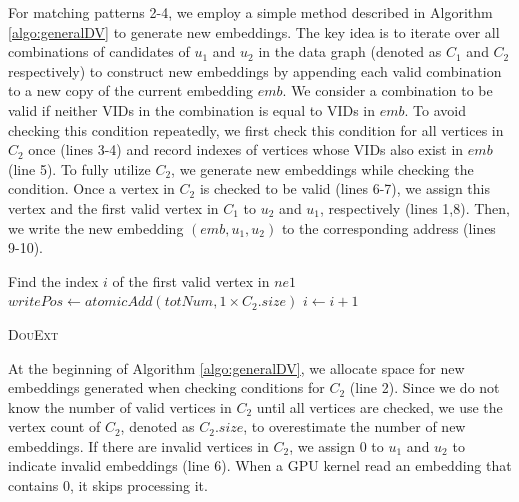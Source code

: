 For matching patterns 2-4, we employ a simple method described in Algorithm \ref{algo:generalDV} to generate new embeddings. The key idea
is to iterate over all combinations of candidates of $u_{1}$ and $u_{2}$ in the data graph (denoted as $C_1$ and $C_2$ respectively) to
construct new embeddings by appending each valid combination to a new copy of the current embedding $emb$. We consider a combination to be
valid if neither VIDs in the combination is equal to VIDs in $emb$. To avoid checking this condition repeatedly, we first check this
condition for all vertices in $C_2$ once (lines 3-4) and record indexes of vertices whose VIDs also exist in $emb$ (line 5). To fully
utilize $C_2$, we generate new embeddings while checking the condition. Once a vertex in $C_2$ is checked to be valid (lines 6-7), we
assign this vertex and the first valid vertex in $C_1$ to $u_2$ and $u_1$, respectively (lines 1,8). Then, we write the new embedding
$(emb,u_1,u_2)$ to the corresponding address (lines 9-10).

\begin{algorithm}[t!]
	Find the index $i$ of the first valid vertex in $ne1$\;
	$writePos \leftarrow atomicAdd(totNum,1 \times C_{2}.size)$\;
	$i \leftarrow i+1$\;
	\caption{\textsc{DouExt}}
	\label{algo:generalDV}
\end{algorithm}

At the beginning of Algorithm \ref{algo:generalDV}, we allocate space for new embeddings generated when checking conditions for $C_2$ (line 2). Since we do not know the number of valid vertices in $C_2$ until all vertices are checked, we use the vertex count of $C_2$, denoted as $C_{2}.size$, to overestimate the number of new embeddings. If there are invalid vertices in $C_2$, we assign 0 to $u_1$ and $u_2$ to indicate invalid embeddings (line 6). When a GPU kernel read an embedding that contains 0, it skips processing it.

